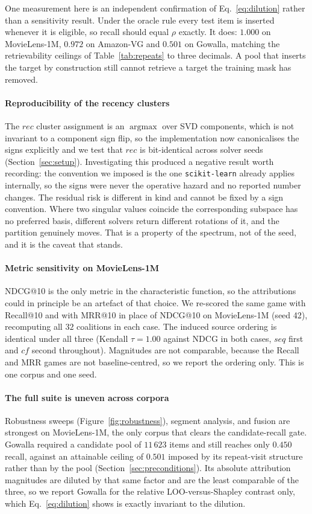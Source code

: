 \documentclass[pdflatex,sn-basic,Numbered]{sn-jnl}
\theoremstyle{plain}
\theoremstyle{definition}
\begin{document}
One measurement here is an independent confirmation of
Eq.~\eqref{eq:dilution} rather than a sensitivity result. Under the oracle
rule every test item is inserted whenever it is eligible, so recall should
equal $\rho$ exactly. It does: $1.000$ on MovieLens-1M, $0.972$ on Amazon-VG
and $0.501$ on Gowalla, matching the retrievability ceilings of
Table~\ref{tab:repeats} to three decimals. A pool that inserts the target by
construction still cannot retrieve a target the training mask has removed.

\paragraph{Reproducibility of the recency clusters}
The $rec$ cluster assignment is an $\operatorname{argmax}$ over SVD
components, which is not invariant to a component sign flip, so the
implementation now canonicalises the signs explicitly and we test that $rec$
is bit-identical across solver seeds (Section~\ref{sec:setup}). Investigating
this produced a negative result worth recording: the convention we imposed is
the one \texttt{scikit-learn} already applies internally, so the signs were
never the operative hazard and no reported number changes. The residual risk
is different in kind and cannot be fixed by a sign convention. Where two
singular values coincide the corresponding subspace has no preferred basis,
different solvers return different rotations of it, and the partition
genuinely moves. That is a property of the spectrum, not of the seed, and it
is the caveat that stands.

\paragraph{Metric sensitivity on MovieLens-1M}
NDCG@10 is the only metric in the characteristic function, so the attributions
could in principle be an artefact of that choice. We re-scored the same game with
Recall@10 and with MRR@10 in place of NDCG@10 on MovieLens-1M (seed 42),
recomputing all $32$ coalitions in each case. The induced source ordering is
identical under all three (Kendall $\tau = 1.00$ against NDCG in both cases,
$seq$ first and $cf$ second throughout). Magnitudes are not comparable, because
the Recall and MRR games are not baseline-centred, so we report the ordering
only. This is one corpus and one seed.

\paragraph{The full suite is uneven across corpora}
Robustness sweeps (Figure~\ref{fig:robustness}), segment analysis, and fusion
are strongest on MovieLens-1M, the only corpus that clears the candidate-recall
gate. Gowalla required a candidate pool of $11\,623$ items and still reaches
only $0.450$ recall, against an attainable ceiling of $0.501$ imposed by its
repeat-visit structure rather than by the pool
(Section~\ref{sec:preconditions}). Its absolute attribution magnitudes are
diluted by that same factor and are the least comparable of the three, so we
report Gowalla for the relative LOO-versus-Shapley contrast only, which
Eq.~\eqref{eq:dilution} shows is exactly invariant to the dilution.
\end{document}
